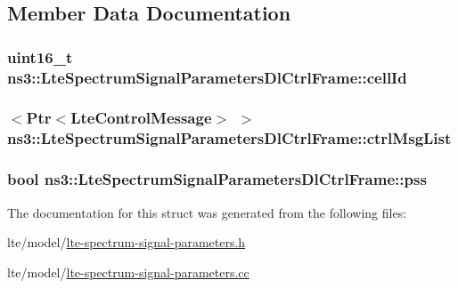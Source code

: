 \subsection{Member Data Documentation}
\subsubsection[{\texorpdfstring{cell\+Id}{cellId}}]{\setlength{\rightskip}{0pt plus 5cm}uint16\+\_\+t ns3\+::\+Lte\+Spectrum\+Signal\+Parameters\+Dl\+Ctrl\+Frame\+::cell\+Id}\hypertarget{structns3_1_1LteSpectrumSignalParametersDlCtrlFrame_aa8b05ebed8e2cfa15d5997f630cc22fb}{}\label{structns3_1_1LteSpectrumSignalParametersDlCtrlFrame_aa8b05ebed8e2cfa15d5997f630cc22fb}
\subsubsection[{\texorpdfstring{ctrl\+Msg\+List}{ctrlMsgList}}]{$<${\bf Ptr}$<${\bf Lte\+Control\+Message}$>$ $>$ ns3\+::\+Lte\+Spectrum\+Signal\+Parameters\+Dl\+Ctrl\+Frame\+::ctrl\+Msg\+List}\hypertarget{structns3_1_1LteSpectrumSignalParametersDlCtrlFrame_a1613baa9c2d4adb03399cdffce07bea6}{}\label{structns3_1_1LteSpectrumSignalParametersDlCtrlFrame_a1613baa9c2d4adb03399cdffce07bea6}
\subsubsection[{\texorpdfstring{pss}{pss}}]{\setlength{\rightskip}{0pt plus 5cm}bool ns3\+::\+Lte\+Spectrum\+Signal\+Parameters\+Dl\+Ctrl\+Frame\+::pss}\hypertarget{structns3_1_1LteSpectrumSignalParametersDlCtrlFrame_a84ab593365d0b4df6450e14aa239cbb0}{}\label{structns3_1_1LteSpectrumSignalParametersDlCtrlFrame_a84ab593365d0b4df6450e14aa239cbb0}


The documentation for this struct was generated from the following files\+:\begin{DoxyCompactItemize}
\item 
lte/model/\hyperlink{lte-spectrum-signal-parameters_8h}{lte-\/spectrum-\/signal-\/parameters.\+h}\item 
lte/model/\hyperlink{lte-spectrum-signal-parameters_8cc}{lte-\/spectrum-\/signal-\/parameters.\+cc}\end{DoxyCompactItemize}
